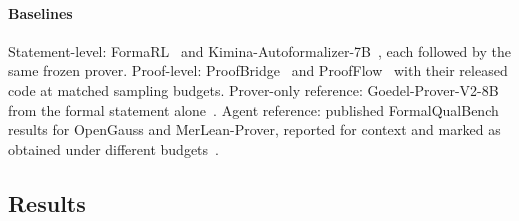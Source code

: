 \documentclass[sigconf,anonymous]{aamas}
\begin{document}
\paragraph{Baselines} Statement-level: FormaRL~\citep{formarl2025} and
Kimina-Autoformalizer-7B~\citep{kimina_prover_2025}, each followed by the same
frozen prover. Proof-level: ProofBridge~\citep{proofbridge2025} and
ProofFlow~\citep{proofflow2025} with their released code at matched sampling
budgets. Prover-only reference: Goedel-Prover-V2-8B from the formal statement
alone~\citep{goedelproverv2_2025}. Agent reference: published FormalQualBench
results for OpenGauss and MerLean-Prover, reported for context and marked as
obtained under different budgets~\citep{opengauss2026, merlean2026}.

\subsection{Results}\label{sec:results}
\end{document}
